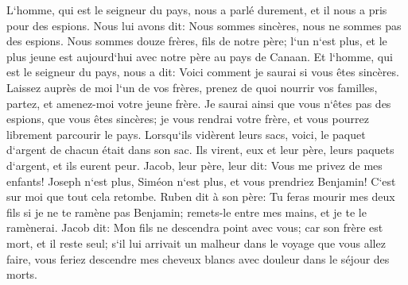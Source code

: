 \verse L`homme, qui est le seigneur du pays, nous a parlé durement, et il nous a pris pour des espions. 
\verse Nous lui avons dit: Nous sommes sincères, nous ne sommes pas des espions. 
\verse Nous sommes douze frères, fils de notre père; l`un n`est plus, et le plus jeune est aujourd`hui avec notre père au pays de Canaan. 
\verse Et l`homme, qui est le seigneur du pays, nous a dit: Voici comment je saurai si vous êtes sincères. Laissez auprès de moi l`un de vos frères, prenez de quoi nourrir vos familles, partez, et amenez-moi votre jeune frère. 
\verse Je saurai ainsi que vous n`êtes pas des espions, que vous êtes sincères; je vous rendrai votre frère, et vous pourrez librement parcourir le pays. 
\verse Lorsqu`ils vidèrent leurs sacs, voici, le paquet d`argent de chacun était dans son sac. Ils virent, eux et leur père, leurs paquets d`argent, et ils eurent peur. 
\verse Jacob, leur père, leur dit: Vous me privez de mes enfants! Joseph n`est plus, Siméon n`est plus, et vous prendriez Benjamin! C`est sur moi que tout cela retombe. 
\verse Ruben dit à son père: Tu feras mourir mes deux fils si je ne te ramène pas Benjamin; remets-le entre mes mains, et je te le ramènerai. 
\verse Jacob dit: Mon fils ne descendra point avec vous; car son frère est mort, et il reste seul; s`il lui arrivait un malheur dans le voyage que vous allez faire, vous feriez descendre mes cheveux blancs avec douleur dans le séjour des morts. 

